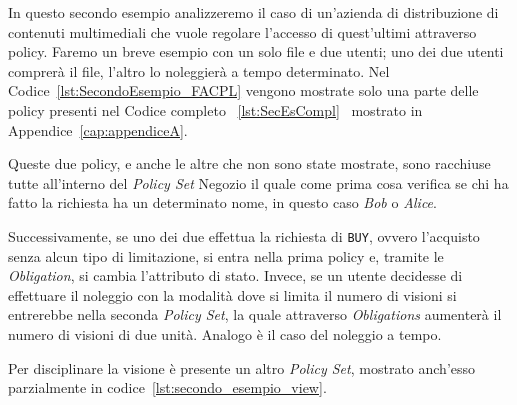 In questo secondo esempio analizzeremo il caso di un'azienda di distribuzione di contenuti multimediali che vuole regolare l'accesso di quest'ultimi attraverso policy.
Faremo un breve esempio con un solo file e due utenti; uno dei due utenti comprerà il file, l'altro lo noleggierà a tempo determinato.
Nel Codice~\ref{lst:SecondoEsempio_FACPL} vengono mostrate solo una parte delle policy presenti nel Codice completo ~\ref{lst:SecEsCompl} \ mostrato in Appendice~\ref{cap:appendiceA}.

Queste due policy, e anche le altre che non sono state mostrate, sono racchiuse tutte all'interno del \textit{Policy Set} Negozio il quale come prima cosa verifica se chi ha fatto la richiesta ha un determinato nome, in questo caso \textit{Bob} o \textit{Alice}. \par
Successivamente, se uno dei due effettua la richiesta di \texttt{BUY}, ovvero l'acquisto senza alcun tipo di limitazione, si entra nella prima policy e, tramite le \textit{Obligation}, si cambia l'attributo di stato. Invece, se un utente decidesse di effettuare il noleggio con la modalità dove si limita il numero di visioni si entrerebbe nella seconda \textit{Policy Set}, la quale attraverso \textit{Obligations} aumenterà il numero di visioni di due unità. Analogo è il caso del noleggio a tempo. \par
Per disciplinare la visione è presente un altro \textit{Policy Set}, mostrato anch'esso parzialmente in codice~\ref{lst:secondo_esempio_view}.


